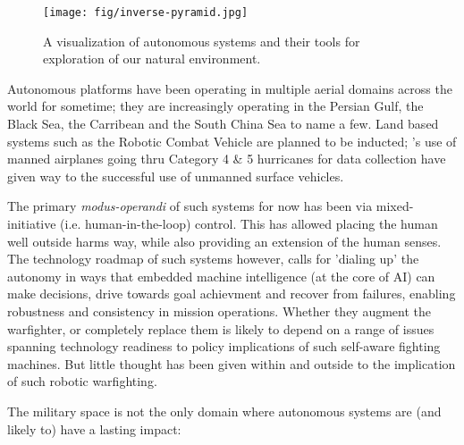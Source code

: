 \documentclass[11pt,letterpaper]{article}
\begin{document}
\begin{figure}  
  \centering 
  \texttt{[image: fig/inverse-pyramid.jpg]} 
  \caption{A visualization of autonomous systems and their tools for
    exploration of our natural environment.}
  \label{fig:inverse}
\end{figure}

Autonomous platforms have been operating in multiple aerial domains
across the world for sometime; they are increasingly operating in the
Persian Gulf, the Black Sea, the Carribean and the South China Sea to
name a few. Land based systems such as the Robotic Combat Vehicle are
planned to be inducted; \noae's use of manned airplanes going thru
Category 4 \& 5 hurricanes for data collection have given way to the
successful use of unmanned surface vehicles.

The primary \emph{modus-operandi} of such systems for now has been via
mixed-initiative (i.e. human-in-the-loop) control. This has allowed
placing the human well outside harms way, while also providing an
extension of the human senses. The technology roadmap of such systems
however, calls for 'dialing up' the autonomy in ways that embedded
machine intelligence (at the core of AI) can make decisions, drive
towards goal achievment and recover from failures, enabling robustness
and consistency in mission operations. Whether they augment the
warfighter, or completely replace them is likely to depend on a range
of issues spanning technology readiness to policy implications of such
self-aware fighting machines. But little thought has been given within
and outside \org to the implication of such robotic warfighting. 

\pagebreak

The military space is not the only domain where autonomous systems are
(and likely to) have a lasting impact:
\end{document}
